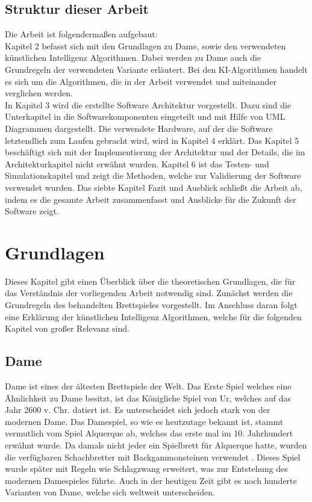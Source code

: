 \documentclass[12pt,a4paper,bibliography=totocnumbered,listof=totocnumbered]{article}
\begin{document}
\subsection{Struktur dieser Arbeit}
Die Arbeit ist folgendermaßen aufgebaut: \\
Kapitel 2 befasst sich mit den Grundlagen zu Dame, sowie den verwendeten 
künstlichen Intelligenz Algorithmen. Dabei werden zu Dame auch die Grundregeln der
verwendeten Variante erläutert. Bei den \ac{KI}-Algorithmen handelt es sich um die Algorithmen, die in 
der Arbeit verwendet und miteinander verglichen werden. \\
In Kapitel 3 wird die erstellte Software Architektur vorgestellt. Dazu sind die Unterkapitel 
in die Softwarekomponenten eingeteilt und mit Hilfe von \ac{UML} Diagrammen dargestellt. 
Die verwendete Hardware, auf der die Software letztendlich zum Laufen gebracht wird, 
wird in Kapitel 4 erklärt. Das Kapitel 5 beschäftigt sich mit der Implementierung der 
Architektur und der Details, die im Architekturkapitel nicht erwähnt wurden. 
Kapitel 6 ist das Testen- und Simulationskapitel und zeigt die Methoden, welche 
zur Validierung der Software verwendet wurden.
Das siebte Kapitel Fazit und Ausblick schließt die Arbeit ab, indem es die gesamte 
Arbeit zusammenfasst und Ausblicke für die Zukunft der Software zeigt.

\pagebreak
\section{Grundlagen}
\label{chap:Grundlagen}
Dieses Kapitel gibt einen Überblick über die theoretischen Grundlagen, die für das Verständnis 
der vorliegenden Arbeit notwendig sind. Zunächst werden die Grundregeln des behandelten Brettspieles 
vorgestellt. Im Anschluss daran folgt eine Erklärung der künstlichen Intelligenz Algorithmen, welche für 
die folgenden Kapitel von großer Relevanz sind. \cite{KuenstlicheIntelligenzNorvig}

\subsection{Dame}
Dame ist eines der ältesten Brettspiele der Welt. Das Erste Spiel welches eine Ähnlichkeit zu Dame besitzt, ist das Königliche
Spiel von Ur, welches auf das Jahr 2600 v. Chr. datiert ist. Es unterscheidet sich jedoch stark von der modernen Dame.
Das Damespiel, so wie es heutzutage bekannt ist, stammt vermutlich vom Spiel Alquerque ab, welches das erste mal im 10. 
Jahrhundert erwähnt wurde. Da damals nicht jeder ein Spielbrett für Alquerque 
hatte, wurden die verfügbaren Schachbretter mit Backgammonsteinen verwendet \cite{SpieleDerWelt}.
Dieses Spiel wurde später mit Regeln wie Schlagzwang erweitert, was zur Entstehung des modernen Damespieles führte.
Auch in der heutigen Zeit gibt es noch hunderte Varianten von Dame, welche sich weltweit unterscheiden.
\end{document}
